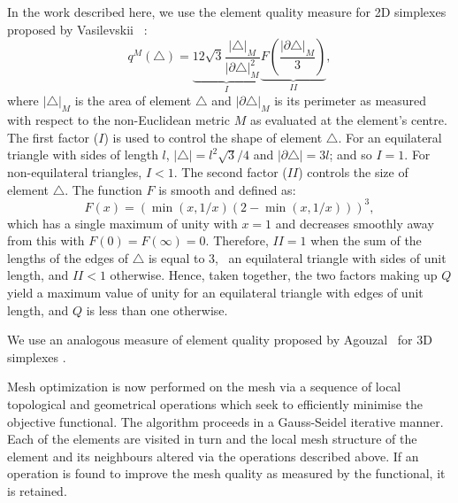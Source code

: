 In the work described here, we use the element quality measure for 2D
simplexes proposed by Vasilevskii \etal\
\cite{vasilevskii1999adaptive}:
\begin{equation}\label{eqn:quality2D}
q^M(\triangle) = \underbrace{12\sqrt{3}\frac{|\triangle|_M}{|\partial\triangle|_M^2}}_{I} \underbrace{F\left(\frac{|\partial\triangle|_M}{3}\right)}_{II},
\end{equation}
where $|\triangle|_M$ is the area of element $\triangle$ and
$|\partial\triangle|_M$ is its perimeter as measured with respect to
the non-Euclidean metric $M$ as evaluated at the element's centre. The
first factor ($I$) is used to control the shape of element
$\triangle$. For an equilateral triangle with sides of length $l$,
$|\triangle| = l^2\sqrt{3}/4$ and $|\partial\triangle| = 3l$; and so
$I=1$. For non-equilateral triangles, $I<1$. The second factor ($II$)
controls the size of element $\triangle$. The function $F$ is smooth
and defined as:
\begin{equation}
F(x) = \left(\min(x, 1/x)(2 - \min(x, 1/x))\right)^3,
\end{equation}
which has a single maximum of
unity with $x=1$ and decreases smoothly away from this with
$F(0)=F(\infty)=0$. Therefore, $II=1$ when the sum of the lengths of the
edges of $\triangle$ is equal to $3$, \eg\ an equilateral triangle with
sides of unit length, and $II<1$ otherwise. Hence, taken together, the
two factors making up $Q$ yield a maximum value of unity for an
equilateral triangle with edges of unit length, and $Q$ is less than
one otherwise. 

We use an analogous measure of element quality proposed by Agouzal
\etal\ for 3D simplexes \cite{agouzal1999}.

Mesh optimization is now performed on the mesh via a sequence of local
topological and geometrical operations \citep{pain2001,freitag1997}
which seek to efficiently minimise the objective functional. The algorithm
proceeds in a Gauss-Seidel iterative manner. Each of the elements are
visited in turn and the local mesh structure of the element and its
neighbours altered via the operations described above. If an operation
is found to improve the mesh quality as measured by the functional,
it is retained.
